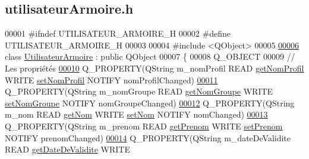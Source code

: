 \hypertarget{utilisateur_armoire_8h_source}{}\subsection{utilisateur\+Armoire.\+h}
\label{utilisateur_armoire_8h_source}

\begin{DoxyCode}
00001 \textcolor{preprocessor}{#ifndef UTILISATEUR\_ARMOIRE\_H}
00002 \textcolor{preprocessor}{#define UTILISATEUR\_ARMOIRE\_H}
00003 
00004 \textcolor{preprocessor}{#include <QObject>}
00005 
\hyperlink{class_utilisateur_armoire}{00006} \textcolor{keyword}{class }\hyperlink{class_utilisateur_armoire}{UtilisateurArmoire} : \textcolor{keyword}{public} QObject
00007 \{
00008     Q\_OBJECT
00009     \textcolor{comment}{// Les propriétés}
\hyperlink{class_utilisateur_armoire_a470f47c105d9b3124c8d284b164a443d}{00010}     Q\_PROPERTY(QString m\_nomProfil READ \hyperlink{class_utilisateur_armoire_a7ab03056bcfa00c2278488f5a381ac18}{getNomProfil} WRITE 
      \hyperlink{class_utilisateur_armoire_ad71dd9b23c6bc145a64727642b1ac3f5}{setNomProfil} NOTIFY nomProfilChanged)
\hyperlink{class_utilisateur_armoire_a6cf08d0dafdc9111d34f34a47c78b373}{00011}     Q\_PROPERTY(QString m\_nomGroupe READ \hyperlink{class_utilisateur_armoire_a714ef42e6907cf73312a55b7f896682a}{getNomGroupe} WRITE 
      \hyperlink{class_utilisateur_armoire_a4d2361e99dd2e84533ce8a2795607306}{setNomGroupe} NOTIFY nomGroupeChanged)
\hyperlink{class_utilisateur_armoire_a39e1227fe3c7d726b161acab6a5c3434}{00012}     Q\_PROPERTY(QString m\_nom READ \hyperlink{class_utilisateur_armoire_a0c7b68d55b8a929a2522cc693b8e250a}{getNom} WRITE \hyperlink{class_utilisateur_armoire_a8a1031cc1ca9a197e49c0adeb1f54923}{setNom} NOTIFY nomChanged)
\hyperlink{class_utilisateur_armoire_a652d7a57ec09963d16ab82838a5ffc51}{00013}     Q\_PROPERTY(QString m\_prenom READ \hyperlink{class_utilisateur_armoire_a000f0cfe0e184a298c74a5eddc39bee7}{getPrenom} WRITE \hyperlink{class_utilisateur_armoire_a26a7087617a276ff5c4e349bda5fed5a}{setPrenom} NOTIFY prenomChanged)
\hyperlink{class_utilisateur_armoire_a51bd81c78d69ea2699373d820bae31e4}{00014}     Q\_PROPERTY(QString m\_dateDeValidite READ \hyperlink{class_utilisateur_armoire_a83c5fad292be7c94e38fc14a5feeae7f}{getDateDeValidite} WRITE 

\end{DoxyCode}
